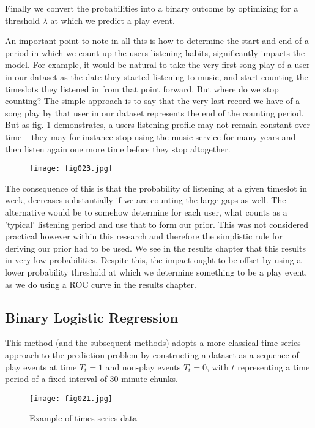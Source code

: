 Finally we convert the probabilities into a binary outcome by optimizing for a threshold $\lambda$ at which we predict a play event.

An important point to note in all this is how to determine the start and end of a period in which we count up the users listening habits, significantly impacts the model. For example, it would be natural to take the very first song play of a user in our dataset as the date they started listening to music, and start counting the timeslots they listened in from that point forward. But where do we stop counting? The simple approach is to say that the very last record we have of a song play by that user in our dataset represents the end of the counting period. But as fig. \ref{fig23} demonstrates, a users listening profile may not remain constant over time -- they may for instance stop using the music service for many years and then listen again one more time before they stop altogether.

\begin{figure}[h!]
	\centering
	\texttt{[image: fig023.jpg]}
	\caption{}
	\label{fig23}
\end{figure} 

The consequence of this is that the probability of listening at a given timeslot in week, decreases substantially if we are counting the large gaps as well. The alternative would be to somehow determine for each user, what counts as a 'typical' listening period and use that to form our prior. This was not considered practical however within this research and therefore the simplistic rule for deriving our prior had to be used. We see in the results chapter that this results in very low probabilities. Despite this, the impact ought to be offset by using a lower probability threshold at which we determine something to be a play event, as we do using a ROC curve in the results chapter.

\subsection{Binary Logistic Regression}

This method (and the subsequent methods) adopts a more classical time-series approach to the prediction problem by constructing a dataset as a sequence of play events at time $T_t = 1$ and non-play events $T_t = 0$, with $t$ representing a time period of a fixed interval of 30 minute chunks.

\begin{figure}[h!]
	\centering
	\texttt{[image: fig021.jpg]}
	\caption{Example of times-series data}
	\label{fig021}
\end{figure} 

